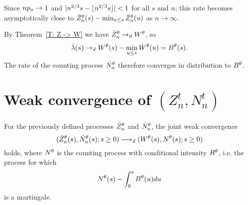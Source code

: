 Since $np_n \rightarrow 1$ and $|n^{2 / 3}s - \lfloor n^{2 / 3}s\rfloor| < 1$ for all $s$ and $n$,
this rate becomes asymptotically close to $\bar{Z}^{\theta}_n(s) - \min_{u \leq s}\bar{Z}^{\theta}_n(u)$ as $n \rightarrow \infty$.

By Theorem~\ref{T: Z -> W} we have $\bar{Z}^{\theta}_n \rightarrow_d W^{\theta}$,
so
\begin{equation}
\bar{\lambda}(s) \rightarrow_d W^{\theta}(s) - \min_{u \leq s}W^{\theta}(u) = B^{\theta}(s).
\end{equation}
The rate of the counting process $\bar{N}_n^{\theta}$ therefore converges in distribution to $B^{\theta}$.




\section{Weak convergence of $(Z^t_n, N^t_n)$}


\begin{theorem} \label{T: Joint Convergence}
	For the previously defined processes $\bar{Z}^{\theta}_n$ and $\bar{N}_n^{\theta}$,
	the joint weak convergence
	\begin{equation}
	( \bar{Z}^{\theta}_n(s), \bar{N}_n^{\theta}(s); s \geq 0 ) \longrightarrow_d (W^{\theta}(s), N^{\theta}(s); s \geq 0)
	\end{equation}
	holds, where $N^{\theta}$ is the counting process with conditional intensity $B^{\theta}$,
	i.e. the process for which
	\begin{equation*}
	N^{\theta}(s) - \int_{0}^s B^{\theta}(u)du
	\end{equation*}
	is a martingale.
\end{theorem}

